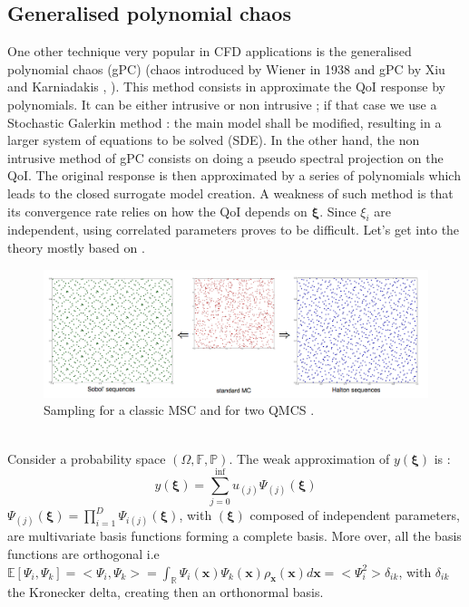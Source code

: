 \documentclass[11pt, a4paper, English]{report}
\begin{document}
\subsection{Generalised polynomial chaos }
One other technique very popular in CFD applications is the generalised polynomial chaos (gPC) (chaos introduced by Wiener in 1938 \cite{gpcFirst} and gPC by Xiu and Karniadakis \cite{gpc1}, \cite{gpc2}). This method consists in approximate the QoI response by polynomials. It can be either intrusive or non intrusive ; if that case we use a Stochastic Galerkin method : the main model shall be modified, resulting in a larger system of equations to be solved (SDE). In the other hand, the non intrusive method of gPC consists on doing a pseudo spectral projection on the QoI. The original response is then approximated by a series of polynomials which leads to the closed surrogate model creation. A weakness of such method is that its convergence rate relies on how the QoI depends on $\boldsymbol{\xi}$. Since $\xi_i$ are independent, using correlated parameters proves to be difficult. Let's get into the theory mostly based on \cite{gpc1}\cite{CoursLucor}. 
\begin{figure}[h!]
    \centering
    \includegraphics[width=\textwidth]{qmc.png}
    \caption{Sampling for a classic MSC and for two QMCS \cite{proba}.}
    \label{MC}
\end{figure}\\
Consider a probability space $(\Omega, \mathbb{F}, \mathbb{P})$.
The weak approximation of $y(\boldsymbol{\xi})$ is : 
$$y(\boldsymbol{\xi})=\sum_{j=0}^{\inf}u_{(j)}\Psi_{(j)}(\boldsymbol{\xi})$$
$\Psi_{(j)}(\boldsymbol{\xi}) = \prod_{i=1}^D \Psi_{i(j)}(\boldsymbol{\xi})$, with $(\boldsymbol{\xi})$ composed of independent parameters, are multivariate basis functions forming a complete basis. More over, all the basis functions are orthogonal i.e $\mathbb{E}[\Psi_i,\Psi_k]=<\Psi_i,\Psi_k>=\int_\mathbb{R}\Psi_i(\boldsymbol{x})\Psi_k(\boldsymbol{x})\rho_{\boldsymbol{x}}(\boldsymbol{x})d\boldsymbol{x} =<\Psi_i^2> \delta_{ik}$, with $\delta_{ik}$ the Kronecker delta, creating then an orthonormal basis.
\end{document}
